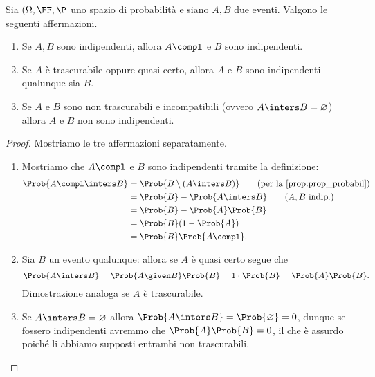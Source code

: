 \begin{proposition}
     Sia $(\Omega, \FF, \P$ uno spazio di probabilità e siano $A, B$ due eventi. Valgono le seguenti affermazioni.
    \begin{enumerate}
        \item Se $A, B$ sono indipendenti, allora $A\compl$ e $B$ sono indipendenti.
        \item Se $A$ è trascurabile oppure quasi certo, allora $A$ e $B$ sono indipendenti qualunque sia $B$.
        \item Se $A$ e $B$ sono non trascurabili e incompatibili (ovvero $A \inters B = \varnothing$) allora $A$ e $B$ non sono indipendenti.
    \end{enumerate}
\end{proposition}
\begin{proof}
    Mostriamo le tre affermazioni separatamente.
    \begin{enumerate}
        \item Mostriamo che $A\compl$ e $B$ sono indipendenti tramite la definizione: \begin{align*}
            \Prob{A\compl \inters B} &= \Prob{B \setminus (A \inters B)}  \tag{per la \ref{prop:prop_probabil}}\\
            &= \Prob{B} - \Prob{A \inters B} \tag{$A, B$ indip.}\\
            &= \Prob{B} - \Prob{A}\Prob{B}\\
            &= \Prob{B}(1 - \Prob{A})\\
            &= \Prob{B}\Prob{A\compl}.
        \end{align*}
        \item Sia $B$ un evento qualunque: allora se $A$ è quasi certo segue che \[
            \Prob{A \inters B} = \Prob{A \given B}\Prob{B} = 1 \cdot \Prob{B} = \Prob{A}\Prob{B}.    
        \] Dimostrazione analoga se $A$ è trascurabile.
        \item Se $A \inters B = \varnothing$ allora $\Prob{A \inters B} = \Prob{\varnothing} = 0$, dunque se fossero indipendenti avremmo che $\Prob{A}\Prob{B} = 0$, il che è assurdo poiché li abbiamo supposti entrambi non trascurabili. \qedhere
    \end{enumerate}
\end{proof}